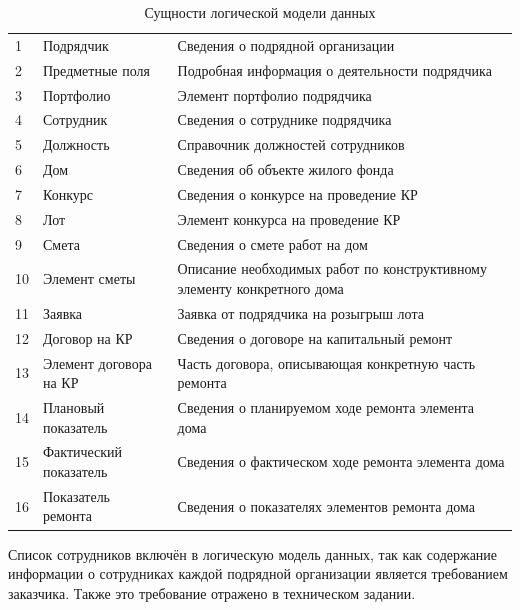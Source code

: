 \begin{footnotesize}
\begin{longtable}[h]{|p{}|p{}|p{}|}
	\caption{\label{tab:inf-entities}Сущности логической модели данных} \\
	\hline
		\thead{№} &
		\thead{Название сущности} &
		\thead{Описание} \\
	\hline \endhead
		1 & Подрядчик & Сведения о подрядной организации \\ \hline
		2 & Предметные поля & Подробная информация о деятельности подрядчика \\ \hline
		3 & Портфолио & Элемент портфолио подрядчика \\ \hline
		4 & Сотрудник & Сведения о сотруднике подрядчика \\ \hline
		5 & Должность & Справочник должностей сотрудников \\ \hline
		6 & Дом & Сведения об объекте жилого фонда \\ \hline
		7 & Конкурс & Сведения о конкурсе на проведение КР \\ \hline
		8 & Лот & Элемент конкурса на проведение КР \\ \hline
		9 & Смета & Сведения о смете работ на дом \\ \hline
		10 & Элемент сметы & Описание необходимых работ по конструктивному элементу конкретного дома \\ \hline
		11 & Заявка & Заявка от подрядчика на розыгрыш лота \\ \hline
		12 & Договор на КР & Сведения о договоре на капитальный ремонт \\ \hline
		13 & Элемент договора на КР & Часть договора, описывающая конкретную часть ремонта \\ \hline
		14 & Плановый показатель & Сведения о планируемом ходе ремонта элемента дома \\ \hline
		15 & Фактический показатель & Сведения о фактическом ходе ремонта элемента дома \\ \hline
		16 & Показатель ремонта & Сведения о показателях элементов ремонта дома \\ \hline
\end{longtable}
\end{footnotesize}

Список сотрудников включён в логическую модель данных, так как содержание информации о сотрудниках каждой подрядной организации является требованием заказчика.
Также это требование отражено в техническом задании.

